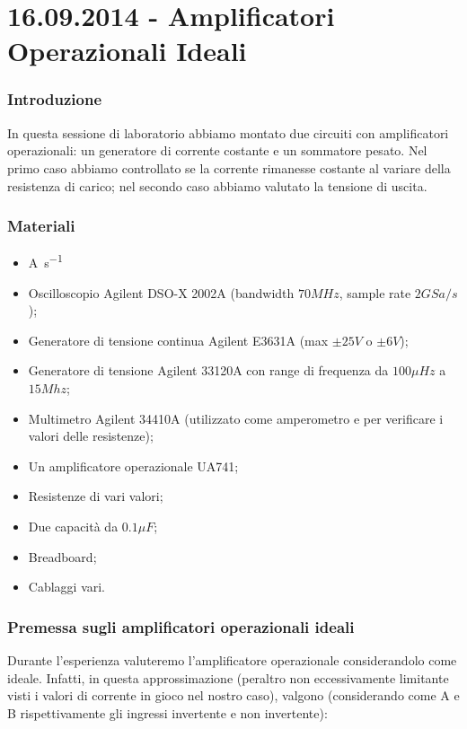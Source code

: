 \part*{16.09.2014 - Amplificatori Operazionali Ideali}

\section{Introduzione}

In questa sessione di laboratorio abbiamo montato due circuiti con amplificatori operazionali: un generatore di corrente costante e un sommatore pesato. Nel primo caso abbiamo controllato se la corrente rimanesse costante al variare della resistenza di carico; nel secondo caso abbiamo valutato la tensione di uscita.

\section{Materiali}

\begin{itemize} [noitemsep]
\item \si{\ampere\per\second}
\item Oscilloscopio Agilent DSO-X 2002A (bandwidth $70 MHz$, sample rate $2 GSa/s$);
\item Generatore di tensione continua Agilent E3631A (max $\pm 25 V$ o $\pm 6V$);
\item Generatore di tensione Agilent 33120A con range di frequenza da $100 \mu Hz$ a $15 Mhz$;
\item Multimetro Agilent 34410A (utilizzato come amperometro e per verificare i valori delle resistenze);
\item Un amplificatore operazionale UA741;
\item Resistenze di vari valori;
\item Due capacità da $0.1 \mu F$;
\item Breadboard;
\item Cablaggi vari.
\end{itemize}

\section{Premessa sugli amplificatori operazionali ideali}

Durante l'esperienza valuteremo l'amplificatore operazionale considerandolo come ideale. Infatti, in questa approssimazione (peraltro non eccessivamente limitante visti i valori di corrente in gioco nel nostro caso), valgono (considerando come A e B rispettivamente gli ingressi invertente e non invertente):

